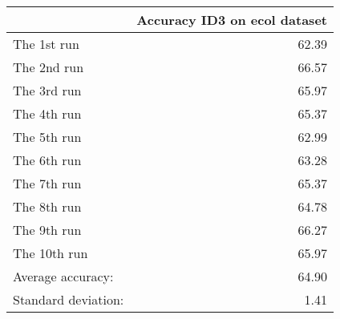 \begin{tabular}{lr}
\toprule
{} &  Accuracy ID3 on ecol dataset \\
\midrule
The 1st run         &                         62.39 \\
The 2nd run         &                         66.57 \\
The 3rd run         &                         65.97 \\
The 4th run         &                         65.37 \\
The 5th run         &                         62.99 \\
The 6th run         &                         63.28 \\
The 7th run         &                         65.37 \\
The 8th run         &                         64.78 \\
The 9th run         &                         66.27 \\
The 10th run        &                         65.97 \\
Average accuracy:   &                         64.90 \\
Standard deviation: &                          1.41 \\
\bottomrule
\end{tabular}

